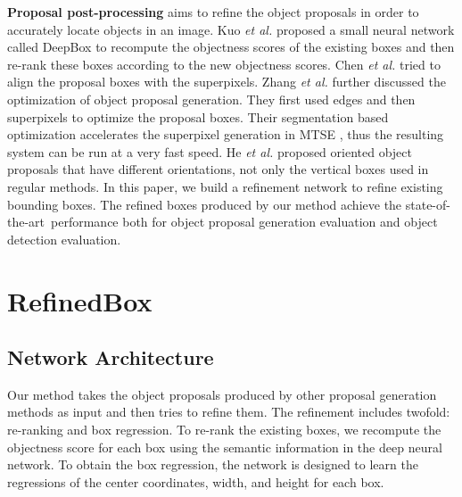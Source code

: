 \documentclass[10pt,twocolumn,letterpaper]{article}
\newcommand{\myPara}[1]{\vspace{.1in}\noindent\textbf{#1}}
\def\etal{{\em et al.}}
\def\sArt{{state-of-the-art~}}
\begin{document}
\myPara{Proposal post-processing} aims to refine the object proposals in
order to accurately locate objects in an image.
%
Kuo \etal \cite{kuo2015deepbox} proposed a small neural network called DeepBox
to recompute the objectness scores of the existing boxes and then re-rank these
boxes according to the new objectness scores.
%
Chen \etal \cite{chen2015improving} tried to align the proposal boxes with the
superpixels.
%
Zhang \etal \cite{zhang2017sequential} further discussed the optimization of
object proposal generation.
They first used edges and then superpixels to optimize the proposal boxes.
Their segmentation based optimization accelerates the superpixel generation in MTSE
\cite{chen2015improving}, thus the resulting system can be run at a very fast speed.
%
He \etal \cite{he2015oriented} proposed oriented object proposals that have 
different orientations, not only the vertical boxes used in regular methods.
%
In this paper, we build a refinement network to refine existing bounding boxes.
The refined boxes produced by our method achieve the \sArt performance both for
object proposal generation evaluation and object detection evaluation.



\section{RefinedBox}
%
\subsection{Network Architecture}
%
Our method takes the object proposals produced by other proposal generation 
methods as input and then tries to refine them.
The refinement includes twofold: re-ranking and box regression.
To re-rank the existing boxes, we recompute the objectness score for each box
using the semantic information in the deep neural network.
To obtain the box regression, the network is designed to learn the regressions
of the center coordinates, width, and height for each box.
\end{document}
